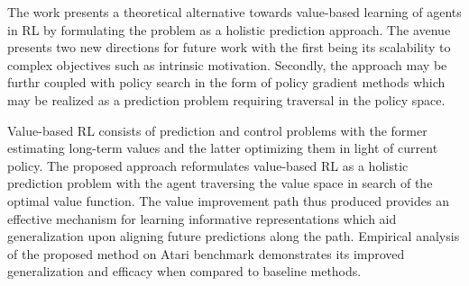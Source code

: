 \documentclass[11pt,letterpaper]{article}
\begin{document}
The work presents a theoretical alternative towards value-based learning of agents in RL by formulating the problem as a holistic prediction approach. The avenue presents two new directions for future work with the first being its scalability to complex objectives such as intrinsic motivation. Secondly, the approach may be furthr coupled with policy search in the form of policy gradient methods which may be realized as a prediction problem requiring traversal in the policy space. 

Value-based RL consists of prediction and control problems with the former estimating long-term values and the latter optimizing them in light of current policy. The proposed approach reformulates value-based RL as a holistic prediction problem with the agent traversing the value space in search of the optimal value function. The value improvement path thus produced provides an effective mechanism for learning informative representations which aid generalization upon aligning future predictions along the path. Empirical analysis of the proposed method on Atari benchmark demonstrates its improved generalization and efficacy when compared to baseline methods.  
\end{document}
